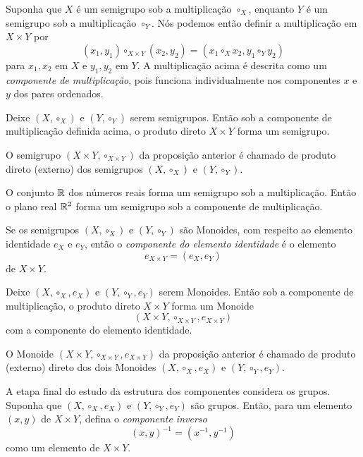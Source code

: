 Suponha que $X$ é um semigrupo sob a multiplicação $\circ_{X}$, enquanto $Y$ é um semigrupo sob a multiplicação $\circ_{Y}$. Nós podemos então definir a multiplicação em $X\times Y$ por
$$(x_{1},y_{1})\circ_{X\times Y} (x_{2},y_{2}) = (x_{1}\circ_{X}x_{2}, y_{1}\circ_{Y}y_{2})$$ para $x_{1},x_{2}$ em $X$ e $y_{1},y_{2}$ em $Y$. A multiplicação acima é descrita como um \emph{componente de multiplicação}, pois funciona individualmente nos componentes $x$ e $y$ dos pares ordenados.

\begin{stat}
  Deixe $(X, \circ_{X})$ e $(Y, \circ_{Y})$ serem semigrupos. Então sob a componente de multiplicação definida acima, o produto direto $X\times Y$ forma um semigrupo.
\end{stat}
\begin{definition}
  O semigrupo $(X\times Y, \circ_{X\times Y})$ da proposição anterior é chamado de produto direto (externo) dos semigrupos $(X, \circ_{X})$ e $(Y,\circ_{Y})$.
\end{definition}
\begin{exmp}
  O conjunto $\mathbb{R}$ dos números reais forma um semigrupo sob a multiplicação. Então o plano real $\mathbb{R}^{2}$ forma um semigrupo sob a componente de multiplicação.
\end{exmp}
Se os semigrupos $(X, \circ_{X})$ e $(Y, \circ_{Y})$ são Monoides, com respeito ao elemento identidade $e_{X}$ e $e_{Y}$, então o \emph{componente do elemento identidade} é o elemento
$$e_{X\times Y} = (e_{X},e_{Y})$$ de $X\times Y$.

\begin{stat}
  Deixe $(X, \circ_{X}, e_{X})$ e $(Y, \circ_{Y}, e_{Y})$ serem Monoides. Então sob a componente de multiplicação, o produto direto $X\times Y$ forma um Monoide
  $$(X\times Y, \circ_{X\times Y}, e_{X\times Y})$$ com a componente do elemento identidade.
\end{stat}
\begin{definition}
  O Monoide $(X\times Y, \circ_{X\times Y}, e_{X\times Y})$ da proposição anterior é chamado de produto (externo) direto dos dois Monoides $(X, \circ_{X}, e_{X})$ e $(Y, \circ_{Y}, e_{Y})$.
\end{definition}
A etapa final do estudo da estrutura dos componentes considera os grupos. Suponha que $(X, \circ_{X}, e_{X})$ e $(Y, \circ_{Y}, e_{Y})$ são grupos. Então, para um elemento $(x,y)$ de $X\times Y$, defina o \emph{componente inverso} $$(x,y)^{-1} = (x^{-1},y^{-1})$$ como um elemento de $X\times Y$.

